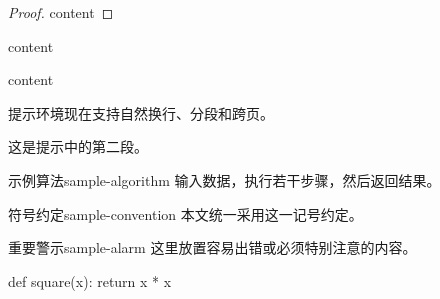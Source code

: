 \begin{proof}
	content
\end{proof}

\begin{answer}
	content
\end{answer}

\begin{sketch}{}{}
	content
\end{sketch}

\begin{hint}
	提示环境现在支持自然换行、分段和跨页。

	这是提示中的第二段。
\end{hint}

\begin{algorithm}{示例算法}{sample-algorithm}
	输入数据，执行若干步骤，然后返回结果。
\end{algorithm}

\begin{convention}{符号约定}{sample-convention}
	本文统一采用这一记号约定。
\end{convention}

\begin{alarm}{重要警示}{sample-alarm}
	这里放置容易出错或必须特别注意的内容。
\end{alarm}

\begin{code}[Python 示例]
def square(x):
    return x * x
\end{code}
